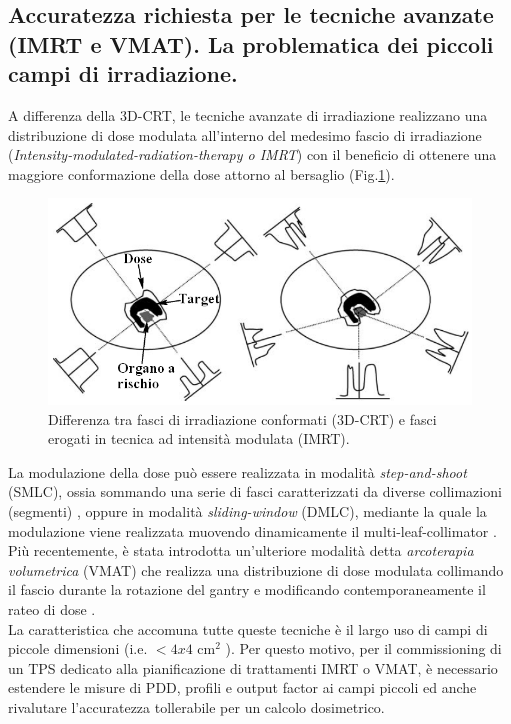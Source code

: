 \subsection{Accuratezza richiesta per le tecniche avanzate (IMRT e VMAT). La problematica dei piccoli campi di irradiazione.}
\label{sec:accu_spec}
A differenza della 3D-CRT, le tecniche avanzate di irradiazione realizzano una distribuzione di dose modulata all'interno del medesimo fascio di irradiazione (\textit{Intensity-modulated-radiation-therapy o IMRT}) con il beneficio di ottenere una maggiore conformazione della dose attorno al bersaglio \cite{ICRU2010} (Fig.\ref{fig:3D_IMRT}).\\
\begin{figure}
\centering
\includegraphics[width=\textwidth]{./cap2/3D_IMRT.png}
\caption{Differenza tra fasci di irradiazione conformati (3D-CRT) e fasci erogati in tecnica ad intensità modulata (IMRT).}
\label{fig:3D_IMRT}
\end{figure}
La modulazione della dose può essere realizzata in modalità \textit{step-and-shoot} (SMLC), ossia sommando una serie di fasci caratterizzati da diverse collimazioni (segmenti) \cite{Bortfeld1994}, oppure in modalità \textit{sliding-window}  (DMLC), mediante la quale la modulazione viene realizzata muovendo dinamicamente il multi-leaf-collimator \cite{LING1996}. Più recentemente, è stata introdotta un'ulteriore modalità detta \textit{arcoterapia volumetrica} (VMAT) che realizza una distribuzione di dose modulata collimando il fascio durante la rotazione del gantry e modificando contemporaneamente il rateo di dose \cite{Otto2008}.\\
La caratteristica che accomuna tutte queste tecniche è il largo uso di campi di piccole dimensioni (i.e. $<4x4$ cm$^2$ \cite{Das2008}). Per questo motivo, per il commissioning di un TPS dedicato alla pianificazione di trattamenti IMRT o VMAT, è necessario estendere le misure di PDD, profili e output factor ai campi piccoli ed anche rivalutare l'accuratezza tollerabile per un calcolo dosimetrico.

